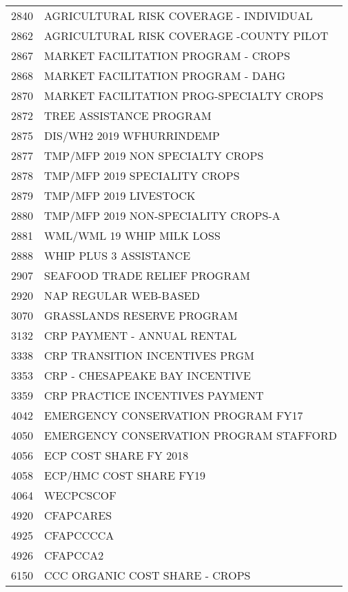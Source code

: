 \begin{longtable}{ll}
\cline{1-2}
2840 & AGRICULTURAL RISK COVERAGE - INDIVIDUAL \\
\cline{1-2}
2862 & AGRICULTURAL RISK COVERAGE -COUNTY PILOT \\
\cline{1-2}
2867 & MARKET FACILITATION PROGRAM - CROPS \\
\cline{1-2}
2868 & MARKET FACILITATION PROGRAM - DAHG \\
\cline{1-2}
2870 & MARKET FACILITATION PROG-SPECIALTY CROPS \\
\cline{1-2}
2872 & TREE ASSISTANCE PROGRAM \\
\cline{1-2}
2875 & DIS/WH2 2019 WFHURRINDEMP \\
\cline{1-2}
2877 & TMP/MFP 2019 NON SPECIALTY CROPS \\
\cline{1-2}
2878 & TMP/MFP 2019 SPECIALITY CROPS \\
\cline{1-2}
2879 & TMP/MFP 2019 LIVESTOCK \\
\cline{1-2}
2880 & TMP/MFP 2019 NON-SPECIALITY CROPS-A \\
\cline{1-2}
2881 & WML/WML 19 WHIP MILK LOSS \\
\cline{1-2}
2888 & WHIP PLUS 3 ASSISTANCE \\
\cline{1-2}
2907 & SEAFOOD TRADE RELIEF PROGRAM \\
\cline{1-2}
2920 & NAP REGULAR WEB-BASED \\
\cline{1-2}
3070 & GRASSLANDS RESERVE PROGRAM \\
\cline{1-2}
3132 & CRP PAYMENT - ANNUAL RENTAL \\
\cline{1-2}
3338 & CRP TRANSITION INCENTIVES PRGM \\
\cline{1-2}
3353 & CRP - CHESAPEAKE BAY INCENTIVE \\
\cline{1-2}
3359 & CRP PRACTICE INCENTIVES PAYMENT \\
\cline{1-2}
4042 & EMERGENCY CONSERVATION PROGRAM FY17 \\
\cline{1-2}
4050 & EMERGENCY CONSERVATION PROGRAM STAFFORD \\
\cline{1-2}
4056 & ECP COST SHARE FY 2018 \\
\cline{1-2}
4058 & ECP/HMC COST SHARE FY19 \\
\cline{1-2}
4064 & WECPCSCOF \\
\cline{1-2}
4920 & CFAPCARES \\
\cline{1-2}
4925 & CFAPCCCCA \\
\cline{1-2}
4926 & CFAPCCA2 \\
\cline{1-2}
\multirow[t]{3}{*}{6150} & CCC ORGANIC COST SHARE - CROPS \\

\end{longtable}
